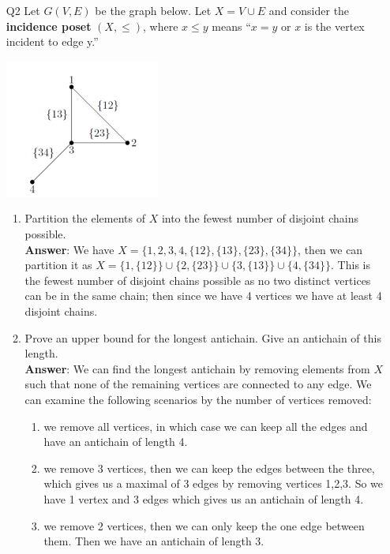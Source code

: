 \documentclass{article}
\begin{document}
\newpage
\begin{itemize}
      \item [Q2]
            Let $G(V,E)$ be the graph below. Let $X=V\cup E$ and consider the \textbf{incidence poset} $(X,\leq)$, where $x\leq y$ means ``$x=y$ or $x$ is the vertex incident to edge y.''
            \begin{center}
                  \includegraphics[width=2in]{q2.png}
            \end{center}
            \begin{enumerate}
                  \item Partition the elements of $X$ into the fewest number of disjoint chains possible.\\
                        \textbf{Answer}: We have $X=\{1,2,3,4,\{12\},\{13\},\{23\},\{34\}\}$, then we can partition it as $X=\{1,\{12\}\}\cup\{2,\{23\}\}\cup\{3,\{13\}\}\cup\{4,\{34\}\}$. This is the fewest number of disjoint chains possible as no two distinct vertices can be in the same chain; then since we have 4 vertices we have at least 4 disjoint chains.
                  \item Prove an upper bound for the longest antichain. Give an antichain of this length.\\
                        \textbf{Answer}: We can find the longest antichain by removing elements from $X$ such that none of the remaining vertices are connected to any edge. We can examine the following scenarios by the number of vertices removed:
                        \begin{enumerate}
                              \item we remove all vertices, in which case we can keep all the edges and have an antichain of length 4.
                              \item we remove 3 vertices, then we can keep the edges between the three, which gives us a maximal of 3 edges by removing vertices 1,2,3. So we have 1 vertex and 3 edges which gives us an antichain of length 4.
                              \item we remove 2 vertices, then we can only keep the one edge between them. Then we have an antichain of length 3.

\end{enumerate}
\end{enumerate}
\end{itemize}
\end{document}
